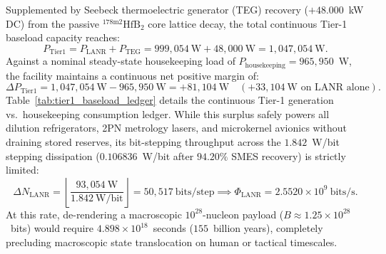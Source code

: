\documentclass[11pt,onecolumn]{article}
\begin{document}
Supplemented by Seebeck thermoelectric generator (TEG) recovery ($+48.000$~kW DC) from the passive $^{178\text{m}2}\text{HfB}_2$ core lattice decay, the total continuous Tier-1 baseload capacity reaches:
\begin{equation}
P_{\text{Tier1}} = P_{\text{LANR}} + P_{\text{TEG}} = 999{,}054~\text{W} + 48{,}000~\text{W} = 1{,}047{,}054~\text{W}.
\end{equation}
Against a nominal steady-state housekeeping load of $P_{\text{housekeeping}} = 965{,}950$~W, the facility maintains a continuous net positive margin of:
\begin{equation}
\Delta P_{\text{Tier1}} = 1{,}047{,}054~\text{W} - 965{,}950~\text{W} = +81{,}104~\text{W} \quad (+33{,}104~\text{W on LANR alone}).
\end{equation}
Table~\ref{tab:tier1_baseload_ledger} details the continuous Tier-1 generation vs.\ housekeeping consumption ledger. While this surplus safely powers all dilution refrigerators, 2PN metrology lasers, and microkernel avionics without draining stored reserves, its bit-stepping throughput across the $1.842$~W/bit stepping dissipation ($0.106836$~W/bit after $94.20\%$ SMES recovery) is strictly limited:
\begin{equation}
\Delta N_{\text{LANR}} = \left\lfloor \frac{93{,}054~\text{W}}{1.842~\text{W/bit}} \right\rfloor = 50{,}517~\text{bits/step} \implies \Phi_{\text{LANR}} = 2.5520 \times 10^9~\text{bits/s}.
\end{equation}
At this rate, de-rendering a macroscopic $10^{28}$-nucleon payload ($B \approx 1.25 \times 10^{28}$~bits) would require $4.898\times 10^{18}$~seconds ($155$~billion years), completely precluding macroscopic state translocation on human or tactical timescales.
\end{document}
